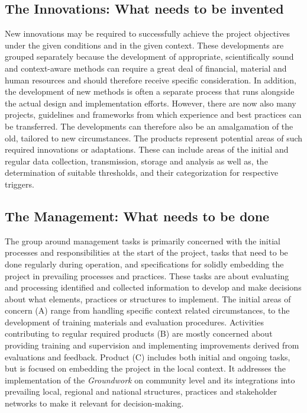
\subsection{The Innovations: What needs to be invented}\label{subsubsec:innovations}
New innovations may be required to successfully achieve the project objectives under the given conditions and in the given context. These developments are grouped separately because the development of appropriate, scientifically sound and context-aware methods can require a great deal of financial, material and human resources and should therefore receive specific consideration. In addition, the development of new methods is often a separate process that runs alongside the actual design and implementation efforts. However, there are now also many projects, guidelines and frameworks from which experience and best practices can be transferred. The developments can therefore also be an amalgamation of the old, tailored to new circumstances.\newline
The products represent potential areas of such required innovations or adaptations. These can include areas of the initial and regular data collection, transmission, storage and analysis as well as, the determination of suitable thresholds, and their categorization for respective triggers.


\subsection{The Management: What needs to be done}\label{subsubsec:management}
The group around management tasks is primarily concerned with the initial processes and responsibilities at the start of the project, tasks that need to be done regularly during operation, and specifications for solidly embedding the project in prevailing processes and practices. These tasks are about evaluating and processing identified and collected information to develop and make decisions about what elements, practices or structures to implement. The initial areas of concern (A) range from handling specific context related circumstances, to the development of training materials and evaluation procedures. Activities contributing to regular required products (B) are mostly concerned about providing training and supervision and implementing improvements derived from evaluations and feedback. Product (C) includes both initial and ongoing tasks, but is focused on embedding the project in the local context. It addresses the implementation of the \textit{Groundwork} on community level and its integrations into prevailing local, regional and national structures, practices and stakeholder networks to make it relevant for decision-making.

